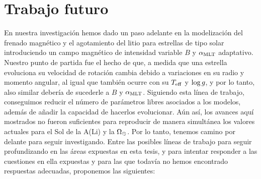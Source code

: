 \section{Trabajo futuro}\label{sec_trabajo_futuro}
En nuestra investigación hemos dado un paso adelante en la modelización del frenado magnético y el agotamiento del litio para estrellas de tipo solar introduciendo un campo magnético de intensidad variable $B$ y $\alpha_{\mathrm{MLT}}$ adaptativo. Nuestro punto de partida fue el hecho de que, a medida que una estrella evoluciona su velocidad de rotación cambia debido a variaciones en su radio y momento angular, al igual que también ocurre con su $T_{\mathrm{eff}}$ y $\mathrm{log} \, g$, y por lo tanto, also similar debería de sucederle a $B$ y $\alpha_{\mathrm{MLT}}$. Siguiendo esta línea de trabajo, conseguimos reducir el número de parámetros libres asociados a los modelos, además de añadir la capacidad de hacerlos evolucionar. Aún así, los avances aquí mostrados no fueron suficientes para reproducir de manera simultánea los valores actuales para el Sol de la A(Li) y la $\Omega_\odot$. Por lo tanto, tenemos camino por delante para seguir investigando. Entre las posibles líneas de trabajo para seguir profundizando en las áreas expuestas en esta tesis, y para intentar responder a las cuestiones en ella expuestas y para las que todavía no hemos encontrado respuestas adecuadas, proponemos las siguientes:

